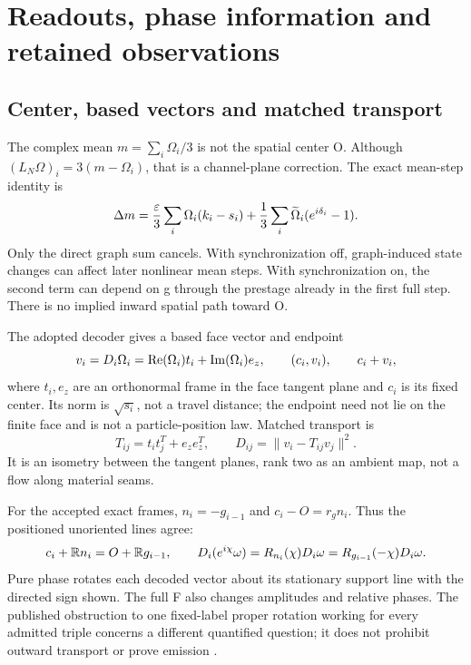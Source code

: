 \section{Readouts, phase information and retained observations}\label{sec:readouts}
\subsection{Center, based vectors and matched transport}
The complex mean $m=\sum_i\Omega_i/3$ is not the spatial center O. Although $(L_N\Omega)_i=3(m-\Omega_i)$, that is a channel-plane correction. The exact mean-step identity is \cite[Section 2]{relaxation}
\begin{equation}\label{eq:mean}
 \Delta m=\frac{\varepsilon}3\sum_i\Omega_i(k_i-s_i)
        +\frac13\sum_i\widetilde\Omega_i(e^{i\delta_i}-1).
\end{equation}
Only the direct graph sum cancels. With synchronization off, graph-induced state changes can affect later nonlinear mean steps. With synchronization on, the second term can depend on g through the prestage already in the first full step. There is no implied inward spatial path toward O.

The adopted decoder \cite{nrg,phase} gives a based face vector and endpoint
\begin{equation}\label{eq:decoder}
 v_i=D_i\Omega_i=\operatorname{Re}(\Omega_i)t_i+\operatorname{Im}(\Omega_i)e_z,
 \qquad(c_i,v_i),\qquad c_i+v_i,
\end{equation}
where $t_i,e_z$ are an orthonormal frame in the face tangent plane and $c_i$ is its fixed center. Its norm is $\sqrt{s_i}$, not a travel distance; the endpoint need not lie on the finite face and is not a particle-position law. Matched transport is
\begin{equation}\label{eq:matched}
 T_{ij}=t_it_j^T+e_ze_z^T,\qquad D_{ij}=\|v_i-T_{ij}v_j\|^2.
\end{equation}
It is an isometry between the tangent planes, rank two as an ambient map, not a flow along material seams.

For the accepted exact frames, $n_i=-g_{i-1}$ and $c_i-O=r_gn_i$. Thus the positioned unoriented lines agree:
\begin{equation}\label{eq:axes}
 c_i+\mathbb R n_i=O+\mathbb R g_{i-1},\qquad
 D_i(e^{i\chi}\omega)=R_{n_i}(\chi)D_i\omega=R_{g_{i-1}}(-\chi)D_i\omega.
\end{equation}
Pure phase rotates each decoded vector about its stationary support line with the directed sign shown. The full F also changes amplitudes and relative phases. The published obstruction to one fixed-label proper rotation working for every admitted triple concerns a different quantified question; it does not prohibit outward transport or prove emission \cite{phase}.

